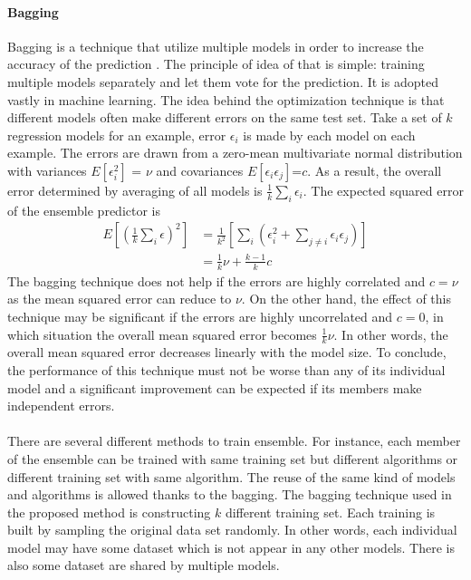 \paragraph{Bagging}
\label{adp_sec:ml_bagging}
Bagging is a technique that utilize multiple models in order to increase the accuracy of the prediction \cite{Breiman1996}.
The principle of idea of that is simple: training multiple models separately and let them vote for the prediction.
It is adopted vastly in machine learning.
The idea behind the optimization technique is that different models often make different errors on the same test set.
Take a set of $k$ regression models for an example, error $\epsilon_i$ is made by each model on each example.
The errors are drawn from a zero-mean multivariate normal distribution with variances $E[\epsilon_i^2]$ = $\nu$ and covariances $E[\epsilon_i \epsilon_j]$=$c$.
As a result, the overall error determined by averaging of all models is $\frac{1}{k}\sum_i \epsilon_i$.
The expected squared error of the ensemble predictor is
\begin{equation}
    \begin{aligned}
    E[(\frac{1}{k} \sum_i \epsilon)^2] &=
    \frac{1}{k^2}[
        \sum_i (
            \epsilon_i^2 + \sum_{j\neq i}\epsilon_i \epsilon_j
        )
    ] \\
    &= \frac{1}{k}\nu + \frac{k-1}{k}c
    \end{aligned}
\end{equation}
%
The bagging technique does not help if the errors are highly correlated and $c=\nu$ as the mean squared error can reduce to $\nu$.
On the other hand, the effect of this technique may be significant if the errors are highly uncorrelated and $c=0$, in which situation the overall mean squared error becomes $\frac{1}{k}\nu$.
In other words, the overall mean squared error decreases linearly with the model size.
To conclude, the performance of this technique must not be worse than any of its individual model and a significant improvement can be expected if its members make independent errors.

\paragraph{}
There are several different methods to train ensemble.
For instance, each member of the ensemble can be trained with same training set but different algorithms or different training set with same algorithm.
The reuse of the same kind of models and algorithms is allowed thanks to the bagging.
The bagging technique used in the proposed method is constructing $k$ different training set.
Each training is built by sampling the original data set randomly.
In other words, each individual model may have some dataset which is not appear in any other models.
There is also some dataset are shared by multiple models.

